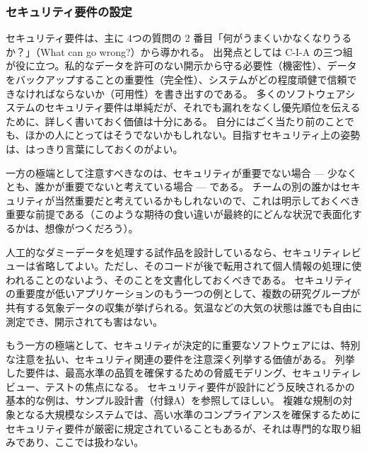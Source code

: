 \documentclass[uplatex]{jsarticle}
\def\label#1{}%
\begin{document}
\subsubsection{セキュリティ要件の設定}\label{subsec:ch6-security-requirements}

セキュリティ要件は、主に 4つの質問の 2 番目「何がうまくいかなくなりうるか？」（What can go wrong?）から導かれる。
出発点としては C-I-A の三つ組が役に立つ。私的なデータを許可のない開示から守る必要性（機密性）、データをバックアップすることの重要性（完全性）、システムがどの程度頑健で信頼できなければならないか（可用性）を書き出すのである。
多くのソフトウェアシステムのセキュリティ要件は単純だが、それでも漏れをなくし優先順位を伝えるために、詳しく書いておく価値は十分にある。
自分にはごく当たり前のことでも、ほかの人にとってはそうでないかもしれない。目指すセキュリティ上の姿勢は、はっきり言葉にしておくのがよい。

一方の極端として注意すべきなのは、セキュリティが重要でない場合 --- 少なくとも、誰かが重要でないと考えている場合 --- である。
チームの別の誰かはセキュリティが当然重要だと考えているかもしれないので、これは明示しておくべき重要な前提である（このような期待の食い違いが最終的にどんな状況で表面化するかは、想像がつくだろう）。

\begin{exa}[セキュリティの重要度が低いアプリケーション]\label{exa:ch6-low-security}
人工的なダミーデータを処理する試作品を設計しているなら、セキュリティレビューは省略してよい。ただし、そのコードが後で転用されて個人情報の処理に使われることのないよう、そのことを文書化しておくべきである。
セキュリティの重要度が低いアプリケーションのもう一つの例として、複数の研究グループが共有する気象データの収集が挙げられる。気温などの大気の状態は誰でも自由に測定でき、開示されても害はない。
\end{exa}

もう一方の極端として、セキュリティが決定的に重要なソフトウェアには、特別な注意を払い、セキュリティ関連の要件を注意深く列挙する価値がある。
列挙した要件は、最高水準の品質を確保するための脅威モデリング、セキュリティレビュー、テストの焦点になる。
セキュリティ要件が設計にどう反映されるかの基本的な例は、サンプル設計書（付録A）を参照してほしい。
複雑な規制の対象となる大規模なシステムでは、高い水準のコンプライアンスを確保するためにセキュリティ要件が厳密に規定されていることもあるが、それは専門的な取り組みであり、ここでは扱わない。
\end{document}
